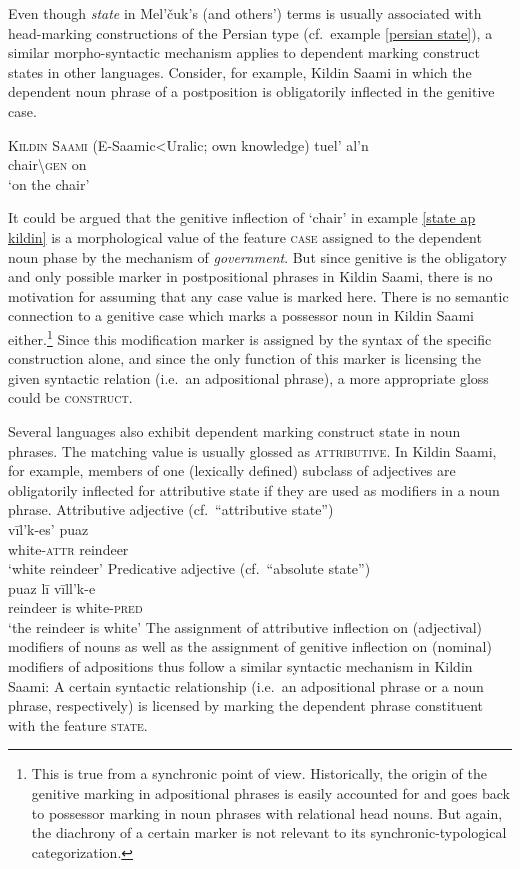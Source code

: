 Even though \emph{state} in Mel'čuk's (and others') terms is usually associated with head-marking constructions of the Persian type (cf.~example \ref{persian state}), a similar morpho-syntactic mechanism applies to dependent marking construct states in other languages. Consider, for example, Kildin Saami in which the dependent noun phrase of a postposition is obligatorily inflected in the genitive case.
\begin{exe}
\ex \textsc{Kildin Saami} (E-Saamic<Uralic; own knowledge)
\label{state ap kildin}
\gll 	tuel'		al'n\\
	chair\textbackslash\textsc{gen}	on\\
\glt 	‘on the chair’
\end{exe}
It could be argued that the genitive inflection of ‘chair’ in example \ref{state ap kildin} is a morphological value of the feature \textsc{case} assigned to the dependent noun phase by the mechanism of \emph{government}. But since genitive is the obligatory and only possible marker in postpositional phrases in Kildin Saami, there is no motivation for assuming that any case value is marked here. There is no semantic connection to a genitive case which marks a possessor noun in Kildin Saami either.\footnote{This is true from a synchronic point of view. Historically, the origin of the genitive marking in adpositional phrases is easily accounted for and goes back to possessor marking in noun phrases with relational head nouns. But again, the diachrony of a certain marker is not relevant to its synchronic-typological categorization.} Since this modification marker is assigned by the syntax of the specific construction alone, and since the only function of this marker is licensing the given syntactic relation (i.e.~an adpositional phrase), a more appropriate gloss could be \textsc{construct}.

Several languages also exhibit dependent marking construct state in noun phrases. The matching value is usually glossed as \textsc{attributive}. In Kildin Saami, for example, members of one (lexically defined) subclass of adjectives are obligatorily inflected for attributive state if they are used as modifiers in a noun phrase.
\label{state np kildin}
\ex	Attributive adjective (cf.~“attributive state”)\\
\gll 	vīl'k-es'		puaz\\
	white-\textsc{attr}	reindeer\\
\glt 	‘white reindeer’
\ex	Predicative adjective (cf.~“absolute state”)\\
\gll	puaz lī vīll'k-e\\
	reindeer is white-\textsc{pred}\\
\glt	‘the reindeer is white’
\zl
The assignment of attributive inflection on (adjectival) modifiers of nouns as well as the assignment of genitive inflection on (nominal) modifiers of adpositions thus follow a similar syntactic mechanism in Kildin Saami: A certain syntactic relationship (i.e.~an adpositional phrase or a noun phrase, respectively) is licensed by marking the dependent phrase constituent with the feature \textsc{state}.

